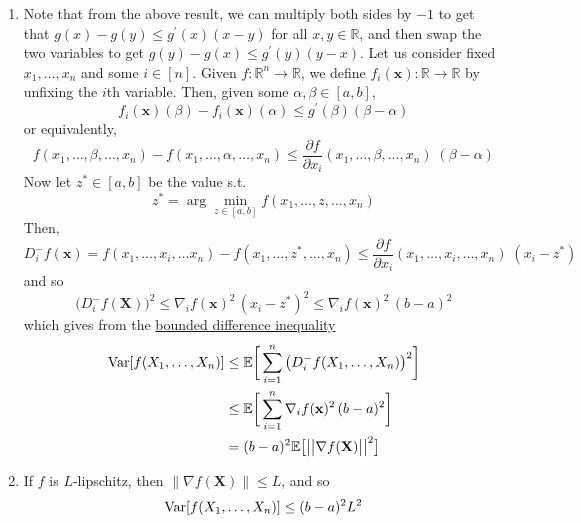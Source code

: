 \begin{solution}
\begin{enumerate}
      \item Note that from the above result, we can multiply both sides by $-1$ to get that $g(x) - g(y) \leq g^\prime (x) (x - y)$ for all $x, y \in \mathbb{R}$, and then swap the two variables to get $g(y) - g(x) \leq g^\prime (y) (y - x)$. Let us consider fixed $x_1, \ldots, x_n$ and some $i \in [n]$. Given $f: \mathbb{R}^n \rightarrow \mathbb{R}$, we define $f_i (\mathbf{x}): \mathbb{R} \rightarrow \mathbb{R}$ by unfixing the $i$th variable. Then, given some $\alpha, \beta \in [a, b]$, 
      \begin{equation}
        f_i (\mathbf{x}) (\beta) - f_i (\mathbf{x}) (\alpha) \leq g^\prime (\beta) (\beta - \alpha)
      \end{equation}
      or equivalently, 
      \begin{equation}
        f(x_1, \ldots, \beta, \ldots, x_n) - f(x_1, \ldots, \alpha, \ldots, x_n) \leq \frac{\partial f}{\partial x_i} (x_1, \ldots, \beta, \ldots, x_n) \; (\beta - \alpha)
      \end{equation}
      Now let $z^\ast \in [a, b]$ be the value s.t. 
      \begin{equation}
        z^\ast = \arg \min_{z \in [a, b]} f(x_1, \ldots, z, \ldots, x_n)
      \end{equation}
      Then, 
      \begin{equation}
        D_i^- f(\mathbf{x}) = f(x_1, \ldots, x_i, \ldots x_n) - f(x_1, \ldots, z^\ast, \ldots, x_n) \leq \frac{\partial f}{\partial x_i} (x_1, \ldots, x_i, \ldots, x_n) \; (x_i - z^\ast)
      \end{equation}
      and so 
      \begin{equation}
        \big( D_i^- f(\mathbf{X}) \big)^2 \leq \nabla_i f (\mathbf{x})^2 \, (x_i - z^\ast)^2 \leq \nabla_i f (\mathbf{x})^2 \, (b - a)^2
      \end{equation}
      which gives from the \hyperref[prob-thm:bounded-difference-inequality]{bounded difference inequality} 
      \begin{align*}
          \operatorname{Var}[f(X_1, \ldots, X_n)] & \leq \mathbb{E} \bigg[ \sum_{i=1}^n \big( D_i^- f(X_1, \ldots, X_n) \big)^2 \bigg] \\
          & \leq \mathbb{E} \bigg[ \sum_{i=1}^n \nabla_i f (\mathbf{x})^2 \, (b - a)^2 \bigg] \\
          & = (b - a)^2 \mathbb{E} \big[ \big| \big| \nabla f(\mathbf{X})\big| \big|^2 \big]
      \end{align*}
      
      \item If $f$ is $L$-lipschitz, then $\|\nabla f(\mathbf{X})\| \leq L$, and so  
      \begin{equation}
        \operatorname{Var}[f(X_1, \ldots, X_n)] \leq (b - a)^2 L^2
      \end{equation}
  \end{enumerate}
  \end{solution}

